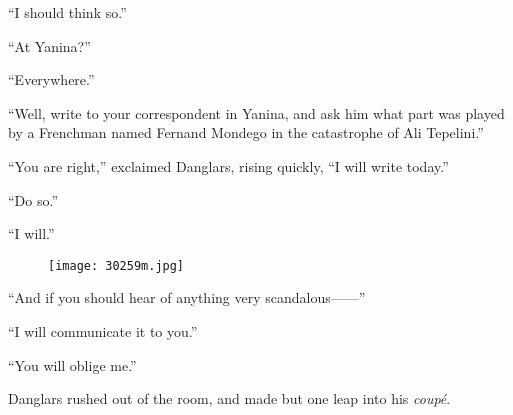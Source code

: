 “I should think so.”

“At Yanina?”

“Everywhere.”

“Well, write to your correspondent in Yanina, and ask him what part was
played by a Frenchman named Fernand Mondego in the catastrophe of Ali
Tepelini.”

“You are right,” exclaimed Danglars, rising quickly, “I will write
today.”

“Do so.”

“I will.”

\begin{figure}[ht]
\texttt{[image: 30259m.jpg]}
\end{figure}

“And if you should hear of anything very scandalous——”

“I will communicate it to you.”

“You will oblige me.”

Danglars rushed out of the room, and made but one leap into his
\textit{coupé}.
